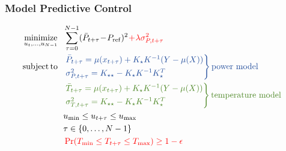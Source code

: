 \begin{frame}[t]
	
	\frametitle{Model Predictive Control}
	
%	
	
	\begin{align*}
	&\minimize_{u_t,\dots,u_{N-1}} \  \  \sum_{\tau=0}^{N-1} (\bar{P}_{t+\tau}\!-\!P_{\mathrm{ref}})^2 \color{red} \!+\! \lambda \sigma^2_{P,t+\tau}\\
	&
	\begin{aligned}
	\subjectto \  \  
	&  \color[RGB]{29,73,153} \begin{rcases}
	 \color[RGB]{29,73,153} \bar{P}_{t+\tau} = \mu(x_{t+\tau}) + K_\star K^{-1} (Y - \mu(X)) \nonumber\\
	 \color[RGB]{29,73,153} \sigma^2_{P,t+\tau} = K_{\star \star} - K_\star K^{-1} K_\star^T
	\end{rcases}  \color[RGB]{29,73,153} \text{power model}\\
	& \color[RGB]{74,133,34} \begin{rcases}
	\color[RGB]{74,133,34} \bar{T}_{t+\tau} = \mu(x_{t+\tau}) + K_\star K^{-1} (Y - \mu(X)) \nonumber\\
	\color[RGB]{74,133,34} \sigma^2_{T,t+\tau} = K_{\star \star} - K_\star K^{-1} K_\star^T
	\end{rcases} \color[RGB]{74,133,34} \text{temperature model}\\
	& u_{\mathrm{min}} \leq u_{t+\tau} \leq u_{\mathrm{max}} \\
	& \tau \in \{ 0, \dots, N-1 \} \\
	& \color{red} \Pr(T_{\mathrm{min}} \leq T_{t+\tau} \leq T_{\mathrm{max}}) \geq 1 - \epsilon \nonumber
	\end{aligned}
\end{align*}

\end{frame}

